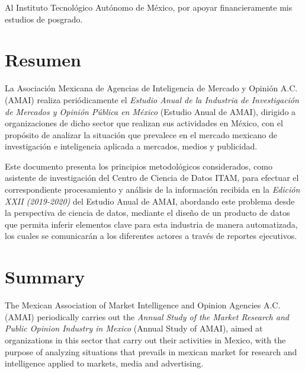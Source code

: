 \documentclass[11pt, oneside]{book}
\begin{document}
\vspace{0.5cm}

Al Instituto Tecnológico Autónomo de México, por apoyar financieramente mis estudios de posgrado.



\chapter*{Resumen}

\noindent La Asociación Mexicana de Agencias de Inteligencia de Mercado y Opinión A.C. (AMAI) realiza periódicamente el \emph{Estudio Anual de la Industria de Investigación de Mercados y Opinión Pública en México} (Estudio Anual de AMAI), dirigido a organizaciones de dicho sector que realizan sus actividades en México, con el propósito  de analizar la situación que  prevalece  en  el  mercado  mexicano  de  investigación  e  inteligencia aplicada a mercados, medios y publicidad.

Este documento presenta los principios metodológicos considerados, como asistente de investigación del Centro de Ciencia de Datos ITAM, para efectuar el correspondiente procesamiento y análisis de la información recibida en la \emph{Edición XXII (2019-2020)} del Estudio Anual de AMAI, abordando este problema desde la perspectiva de ciencia de datos, mediante el diseño de un producto de datos que permita inferir elementos clave para esta industria de manera automatizada, los cuales se comunicarán a los diferentes actores a través de reportes ejecutivos.

\pagestyle{plain}

\noindent 


\chapter*{Summary}

\noindent The Mexican Association of Market Intelligence and Opinion Agencies A.C. (AMAI) periodically carries out the \emph{Annual Study of the Market Research and Public Opinion Industry in Mexico} (Annual Study of AMAI), aimed at organizations in this sector that carry out their activities in Mexico, with the purpose of analyzing situations that prevails in mexican market for research and intelligence applied to markets, media and advertising.
\end{document}
